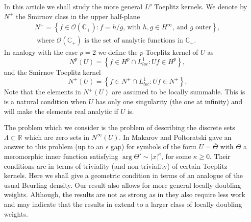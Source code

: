 \documentclass{article}[12pt]
\theoremstyle{remark}
\begin{document}
In this article we shall study the more general $L^{p}$ Toeplitz kernels. We denote by $N^{+}$ the Smirnov class in the upper half-plane
\begin{equation*}
\begin{split}
    N^{+} = \left\{ f \in \mathcal{O}(\mathbb{C}_{+}) : f = h/g \text{, with } h,g \in H^{\infty} \text{, and } g \text{ outer}\right\}, \\
    \text{ where } \mathcal{O}(\mathbb{C}_{+}) \text{ is the set of analytic functions in } \mathbb{C}_{+}.
\end{split}
\end{equation*}
In analogy with the case $p=2$ we define the $p$-Toeplitz kernel of $U$ as
\begin{equation*}
    N^{p}(U) = \left\{ f\in H^{p} \cap L^{1}_{loc} : \overline{Uf} \in H^{p} \right\},
\end{equation*}
and the Smirnov Toeplitz kernel
\begin{equation*}
    N^{+}(U) = \left\{ f \in N^{+} \cap L^{1}_{loc} : \overline{Uf} \in N^{+} \right\}.
\end{equation*}
Note that the elements in $N^{+}(U)$ are assumed to be locally summable. This is is a natural condition when $U$ has only one singularity (the one at infinity) and will make the elements real analytic if $U$ is.\newline

The problem which we consider is the problem of describing the discrete sets $\Lambda \subset \mathbb{R}$ which are zero sets in $N^{\infty}(U)$. In \cite{MR2609247} Makarov and Poltoratski gave an answer to this problem (up to an $\epsilon$ gap) for symbols of the form $U = \overline{\Theta}$ with $\Theta$ a meromorphic inner function satisfying $\arg \Theta' \sim \lvert x \rvert^{\kappa}$, for some $\kappa \geq 0$. Their conditions are in terms of triviality (and non triviality) of certain Toeplitz kernels. Here we shall give a geometric condition in terms of an analogue of the usual Beurling density. Our result also allows for more general locally doubling weights. Although, the results are not as strong as in \cite{MR2609247} they also require less work and may indicate that the results in \cite{MR2609247} extend to a larger class of locally doubling weights.\newline
\end{document}
